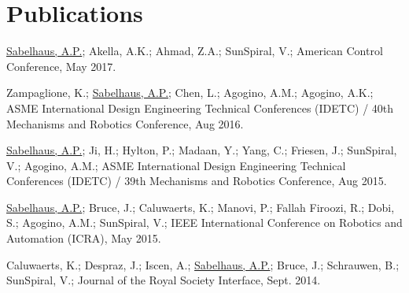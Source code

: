 \documentclass[letterpaper]{deedy-resume} %
\begin{document}

  
\section{Publications}



\begin{etaremune}

\item {} \underline{Sabelhaus, A.P.}; Akella, A.K.; Ahmad, Z.A.; SunSpiral, V.; American Control Conference, May 2017.
  
\item {} Zampaglione, K.; \underline{Sabelhaus, A.P.};  Chen, L.;  Agogino, A.M.;  Agogino, A.K.;  ASME International Design Engineering Technical Conferences (IDETC) / 40th Mechanisms and Robotics Conference, Aug 2016.
  
\item {} \underline{Sabelhaus, A.P.}; Ji, H.; Hylton, P.; Madaan, Y.; Yang, C.; Friesen, J.; SunSpiral, V.; Agogino, A.M.; ASME International Design Engineering Technical Conferences (IDETC) / 39th Mechanisms and Robotics Conference, Aug 2015.

\item {} \underline{Sabelhaus, A.P.}; Bruce, J.; Caluwaerts, K.; Manovi, P.; Fallah Firoozi, R.; Dobi, S.; Agogino, A.M.; SunSpiral, V.; IEEE International Conference on Robotics and Automation (ICRA), May 2015.

\item {} Caluwaerts, K.; Despraz, J.; Iscen, A.; \underline{Sabelhaus, A.P.}; Bruce, J.; Schrauwen, B.; SunSpiral, V.;  Journal of the Royal Society Interface, Sept. 2014.


\end{etaremune}
\end{document}
